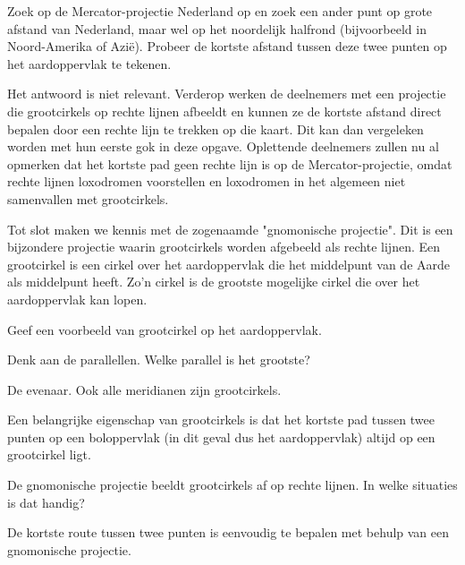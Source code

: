 \begin{opgave}
	Zoek op de Mercator-projectie Nederland op en zoek een ander punt op grote afstand van Nederland, maar wel op het noordelijk halfrond (bijvoorbeeld in Noord-Amerika of Azi\"e). Probeer de kortste afstand tussen deze twee punten op het aardoppervlak te tekenen.
	\begin{antwoord}
		Het antwoord is niet relevant. Verderop werken de deelnemers met een projectie die grootcirkels op rechte lijnen afbeeldt en kunnen ze de kortste afstand direct bepalen door een rechte lijn te trekken op die kaart. Dit kan dan vergeleken worden met hun eerste gok in deze opgave. Oplettende deelnemers zullen nu al opmerken dat het kortste pad geen rechte lijn is op de Mercator-projectie, omdat rechte lijnen loxodromen voorstellen en loxodromen in het algemeen niet samenvallen met grootcirkels.
	\end{antwoord}
\end{opgave}

Tot slot maken we kennis met de zogenaamde "gnomonische projectie". Dit is een bijzondere projectie waarin grootcirkels worden afgebeeld als rechte lijnen. Een grootcirkel is een cirkel over het aardoppervlak die het middelpunt van de Aarde als middelpunt heeft. Zo'n cirkel is de grootste mogelijke cirkel die over het aardoppervlak kan lopen.

\begin{opgave}
	Geef een voorbeeld van grootcirkel op het aardoppervlak.
	\begin{hint}
		Denk aan de parallellen. Welke parallel is het grootste?
	\end{hint}
	\begin{antwoord}
		De evenaar. Ook alle meridianen zijn grootcirkels.
	\end{antwoord}
\end{opgave}

Een belangrijke eigenschap van grootcirkels is dat het kortste pad tussen twee punten op een boloppervlak (in dit geval dus het aardoppervlak) altijd op een grootcirkel ligt.

\begin{opgave}
	De gnomonische projectie beeldt grootcirkels af op rechte lijnen. In welke situaties is dat handig?
	\begin{antwoord}
		De kortste route tussen twee punten is eenvoudig te bepalen met behulp van een gnomonische projectie.
	\end{antwoord}
\end{opgave}

